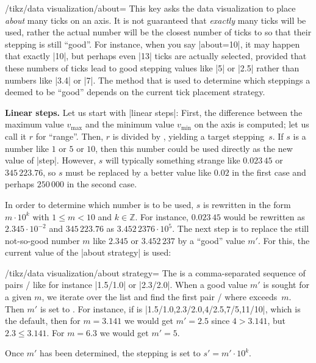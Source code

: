 \begin{key}{/tikz/data visualization/about=}
    This key asks the data visualization to place \emph{about} 
    many ticks on an axis. It is not guaranteed that \emph{exactly}  many ticks will be used, rather the actual number will be the closest number of ticks to  so that their stepping is still ``good''. For instance, when you say |about=10|, it may happen that exactly |10|, but perhaps even |13| ticks are actually selected, provided that these numbers of ticks lead to good stepping values like |5| or |2.5| rather than numbers like |3.4| or |7|. The method that is used to determine which steppings a deemed to be ``good'' depends on the current tick placement strategy.


    \medskip
    \textbf{Linear steps.}
    Let us start with |linear steps|: First, the difference between the maximum value $v_{\max}$ and the minimum value $v_{\min}$ on the axis is computed; let us call it $r$ for ``range''. Then, $r$ is divided by , yielding a target stepping~$s$. If $s$ is a number like $1$ or $5$ or $10$, then this number could be used directly as the new value of |step|. However, $s$ will typically something strange like $0.023\,45$ or $345\,223.76$, so $s$ must be replaced by a better value like $0.02$ in the first case and perhaps $250\,000$ in the second case.

    In order to determine which number is to be used, $s$ is rewritten in the form $m \cdot 10^k$ with $1 \le m < 10$ and $k \in \mathbb Z$. For instance, $0.023\,45$ would be rewritten as $2.345 \cdot 10^{-2}$ and $345\,223.76$ as $3.452\,2376 \cdot 10^5$. The next step is to replace the still not-so-good number $m$ like $2.345$ or $3.452\,237$ by a ``good'' value $m'$. For this, the current value of the |about strategy| is used:
    \begin{key}{/tikz/data visualization/about strategy=}
        The  is a comma-separated sequence of pairs / like for instance |1.5/1.0| or |2.3/2.0|. When a good value $m'$ is sought for a given $m$, we iterate over the list and find the first pair / where  exceeds~$m$. Then $m'$ is set to . For instance, if  is |1.5/1.0,2.3/2.0,4/2.5,7/5,11/10|, which is the default, then for $m=3.141$ we would get $m'=2.5$ since $4 > 3.141$, but $2.3 \le 3.141$. For $m=6.3$ we would get $m'=5$.
    \end{key}
    Once $m'$ has been determined, the stepping is set to $s' = m' \cdot 10^k$.


\end{key}
